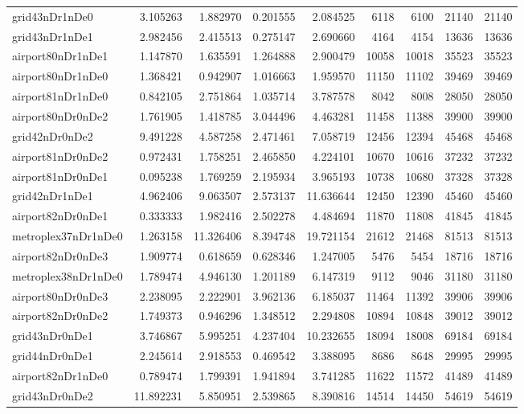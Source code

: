 \begin{longtable}{|l|r|r|r|r|r|r|r|r|}
grid43nDr1nDe0 & 3.105263 & 1.882970 & 0.201555 & 2.084525 & 6118 & 6100 & 21140 & 21140 \\
grid43nDr1nDe1 & 2.982456 & 2.415513 & 0.275147 & 2.690660 & 4164 & 4154 & 13636 & 13636 \\
airport80nDr1nDe1 & 1.147870 & 1.635591 & 1.264888 & 2.900479 & 10058 & 10018 & 35523 & 35523 \\
airport80nDr1nDe0 & 1.368421 & 0.942907 & 1.016663 & 1.959570 & 11150 & 11102 & 39469 & 39469 \\
airport81nDr1nDe0 & 0.842105 & 2.751864 & 1.035714 & 3.787578 & 8042 & 8008 & 28050 & 28050 \\
airport80nDr0nDe2 & 1.761905 & 1.418785 & 3.044496 & 4.463281 & 11458 & 11388 & 39900 & 39900 \\
grid42nDr0nDe2 & 9.491228 & 4.587258 & 2.471461 & 7.058719 & 12456 & 12394 & 45468 & 45468 \\
airport81nDr0nDe2 & 0.972431 & 1.758251 & 2.465850 & 4.224101 & 10670 & 10616 & 37232 & 37232 \\
airport81nDr0nDe1 & 0.095238 & 1.769259 & 2.195934 & 3.965193 & 10738 & 10680 & 37328 & 37328 \\
grid42nDr1nDe1 & 4.962406 & 9.063507 & 2.573137 & 11.636644 & 12450 & 12390 & 45460 & 45460 \\
airport82nDr0nDe1 & 0.333333 & 1.982416 & 2.502278 & 4.484694 & 11870 & 11808 & 41845 & 41845 \\
metroplex37nDr1nDe0 & 1.263158 & 11.326406 & 8.394748 & 19.721154 & 21612 & 21468 & 81513 & 81513 \\
airport82nDr0nDe3 & 1.909774 & 0.618659 & 0.628346 & 1.247005 & 5476 & 5454 & 18716 & 18716 \\
metroplex38nDr1nDe0 & 1.789474 & 4.946130 & 1.201189 & 6.147319 & 9112 & 9046 & 31180 & 31180 \\
airport80nDr0nDe3 & 2.238095 & 2.222901 & 3.962136 & 6.185037 & 11464 & 11392 & 39906 & 39906 \\
airport82nDr0nDe2 & 1.749373 & 0.946296 & 1.348512 & 2.294808 & 10894 & 10848 & 39012 & 39012 \\
grid43nDr0nDe1 & 3.746867 & 5.995251 & 4.237404 & 10.232655 & 18094 & 18008 & 69184 & 69184 \\
grid44nDr0nDe1 & 2.245614 & 2.918553 & 0.469542 & 3.388095 & 8686 & 8648 & 29995 & 29995 \\
airport82nDr1nDe0 & 0.789474 & 1.799391 & 1.941894 & 3.741285 & 11622 & 11572 & 41489 & 41489 \\
grid43nDr0nDe2 & 11.892231 & 5.850951 & 2.539865 & 8.390816 & 14514 & 14450 & 54619 & 54619 \\

\end{longtable}
